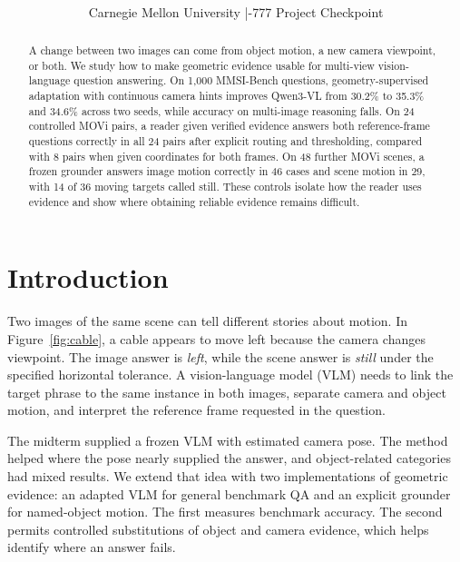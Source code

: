 \documentclass[10pt,letterpaper]{article}
\title{\vspace{-2.5em}\bfseries \papertitle}
\author{\people\\[2pt]\small Carnegie Mellon University \enspace|\enspace 11-777 Project Checkpoint}
\date{}
\newif\ificmlstyle
\newcommand{\papertitle}{From Camera Pose to Object Motion in Multi-View QA}
\begin{document}
\ificmlstyle
  \twocolumn[
  \icmltitle{\papertitle}
  \begin{icmlauthorlist}
  \icmlauthor{Ashman Mehra}{cmu}
  \icmlauthor{Wen-Chi Tsai}{cmu}
  \icmlauthor{Zhengfei Li}{cmu}
  \icmlauthor{Mike Pupat}{cmu}
  \end{icmlauthorlist}
  \icmlaffiliation{cmu}{Carnegie Mellon University}
  \vskip .3in
  ]
  \printAffiliationsAndNotice{11-777 Project Checkpoint, Fall 2026.}
\else
  \twocolumn[\maketitle]
\fi
\begin{abstract}
A change between two images can come from object motion, a new camera viewpoint, or both. We study how to make geometric evidence usable for multi-view vision-language question answering. On 1,000 MMSI-Bench questions, geometry-supervised adaptation with continuous camera hints improves Qwen3-VL from 30.2\% to 35.3\% and 34.6\% across two seeds, while accuracy on multi-image reasoning falls. On 24 controlled MOVi pairs, a reader given verified evidence answers both reference-frame questions correctly in all 24 pairs after explicit routing and thresholding, compared with 8 pairs when given coordinates for both frames. On 48 further MOVi scenes, a frozen grounder answers image motion correctly in 46 cases and scene motion in 29, with 14 of 36 moving targets called still. These controls isolate how the reader uses evidence and show where obtaining reliable evidence remains difficult.
\end{abstract}

\section{Introduction}
Two images of the same scene can tell different stories about motion. In Figure~\ref{fig:cable}, a cable appears to move left because the camera changes viewpoint. The image answer is \emph{left}, while the scene answer is \emph{still} under the specified horizontal tolerance. A vision-language model (VLM) needs to link the target phrase to the same instance in both images, separate camera and object motion, and interpret the reference frame requested in the question.

The midterm supplied a frozen VLM with estimated camera pose. The method helped where the pose nearly supplied the answer, and object-related categories had mixed results. We extend that idea with two implementations of geometric evidence: an adapted VLM for general benchmark QA and an explicit grounder for named-object motion. The first measures benchmark accuracy. The second permits controlled substitutions of object and camera evidence, which helps identify where an answer fails.
\end{document}
